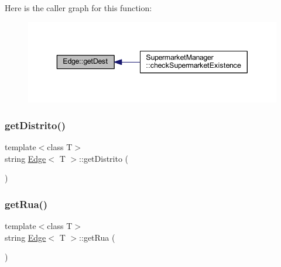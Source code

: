 Here is the caller graph for this function\+:
\nopagebreak
\begin{figure}[H]
\begin{center}
\leavevmode
\includegraphics[width=343pt]{class_edge_aaac5b053bdaa88b1da416e734487eb25_icgraph}
\end{center}
\end{figure}
\mbox{\label{class_edge_a03d90697f0dd989971c4a6253cd7fa92}} 
\subsubsection{\texorpdfstring{get\+Distrito()}{getDistrito()}}
{\footnotesize\ttfamily template$<$class T$>$ \\
string \hyperlink{class_edge}{Edge}$<$ T $>$\+::get\+Distrito (\begin{DoxyParamCaption}{ }\end{DoxyParamCaption})\hspace{0.3cm}{\ttfamily [inline]}}

\mbox{\label{class_edge_accb828015f1926387735bc967b236bc0}} 
\subsubsection{\texorpdfstring{get\+Rua()}{getRua()}}
{\footnotesize\ttfamily template$<$class T$>$ \\
string \hyperlink{class_edge}{Edge}$<$ T $>$\+::get\+Rua (\begin{DoxyParamCaption}{ }\end{DoxyParamCaption})\hspace{0.3cm}{\ttfamily [inline]}}

\mbox{\label{class_edge_a2645a9ac350e79626dc5472714b3b3b1}} 
